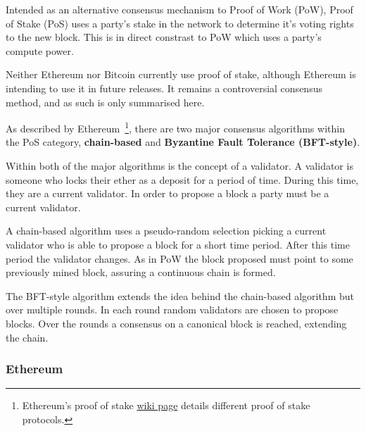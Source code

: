 Intended as an alternative consensus mechanism to Proof of Work (PoW), Proof of Stake (PoS) uses a party's stake in the network to determine it's voting rights to the new block. This is in direct constrast to PoW which uses a party's compute power.

Neither Ethereum nor Bitcoin currently use proof of stake, although Ethereum is intending to use it in future releases. It remains a controversial consensus method, and as such is only summarised here.

As described by Ethereum~\footnote{Ethereum's proof of stake \href{https://github.com/ethereum/wiki/wiki/Proof-of-Stake-FAQ}{wiki page} details different proof of stake protocols.}, there are two major consensus algorithms within the PoS category, \textbf{chain-based} and \textbf{Byzantine Fault Tolerance (BFT-style)}.

Within both of the major algorithms is the concept of a validator. A validator is someone who locks their ether as a deposit for a period of time. During this time, they are a current validator. In order to propose a block a party must be a current validator.

A chain-based algorithm uses a pseudo-random selection picking a current validator who is able to propose a block for a short time period. After this time period the validator changes. As in PoW the block proposed must point to some previously mined block, assuring a continuous chain is formed.

The BFT-style algorithm extends the idea behind the chain-based algorithm but over multiple rounds. In each round random validators are chosen to propose blocks. Over the rounds a consensus on a canonical block is reached, extending the chain.




\subsubsection{Ethereum}

